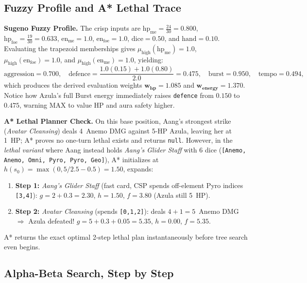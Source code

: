 \documentclass[11pt,a4paper]{article}
\begin{document}
\subsection{Fuzzy Profile and A* Lethal Trace}

\textbf{Sugeno Fuzzy Profile.} The crisp inputs are $\text{hp}_{\text{me}} = \frac{24}{30} = 0.800$, $\text{hp}_{\text{foe}} = \frac{19}{30} = 0.633$, $\text{en}_{\text{me}} = 1.0$, $\text{en}_{\text{foe}} = 1.0$, $\text{dice} = 0.50$, and $\text{hand} = 0.10$. Evaluating the trapezoid memberships gives $\mu_{\text{high}}(\text{hp}_{\text{me}}) = 1.0$, $\mu_{\text{high}}(\text{en}_{\text{foe}}) = 1.0$, and $\mu_{\text{high}}(\text{en}_{\text{me}}) = 1.0$, yielding:
\[
  \text{aggression} = 0.700, \quad
  \text{defence} = \frac{1.0(0.15) + 1.0(0.80)}{2.0} = 0.475, \quad
  \text{burst} = 0.950, \quad
  \text{tempo} = 0.494,
\]
which produces the derived evaluation weights $\mathbf{w_{\text{hp}} = 1.085}$ and $\mathbf{w_{\text{energy}} = 1.370}$. Notice how Azula's full Burst energy immediately raises \texttt{defence} from $0.150$ to $0.475$, warning MAX to value HP and aura safety higher.

\textbf{A* Lethal Planner Check.} On this base position, Aang's strongest strike (\emph{Avatar Cleansing}) deals 4~Anemo DMG against 5-HP Azula, leaving her at 1~HP; A* proves no one-turn lethal exists and returns \texttt{null}. However, in the \emph{lethal variant} where Aang instead holds \emph{Aang's Glider Staff} with 6 dice (\texttt{[Anemo, Anemo, Omni, Pyro, Pyro, Geo]}), A* initializes at $h(s_0) = \max(0, 5/2.5 - 0.5) = 1.50$, expands:
\begin{enumerate}[leftmargin=1.4em, itemsep=1pt]
  \item \textbf{Step 1:} \emph{Aang's Glider Staff} (fast card, CSP spends off-element Pyro indices \texttt{[3,4]}): $g = 2 + 0.3 = 2.30$, $h = 1.50$, $f = 3.80$ (Azula still 5~HP).
  \item \textbf{Step 2:} \emph{Avatar Cleansing} (spends \texttt{[0,1,2]}): deals $4+1 = 5$~Anemo DMG $\Rightarrow$ Azula defeated! $g = 5 + 0.3 + 0.05 = 5.35$, $h = 0.00$, $f = 5.35$.
\end{enumerate}
A* returns the exact optimal 2-step lethal plan instantaneously before tree search even begins.

\subsection{Alpha-Beta Search, Step by Step}
\end{document}
